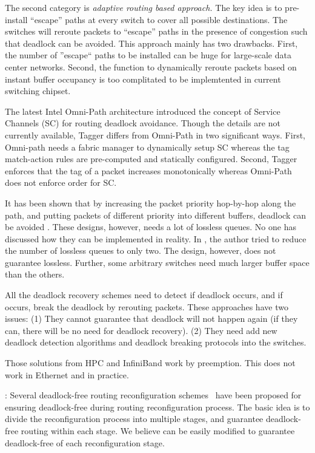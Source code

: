 The second category is {\em adaptive routing based approach.} The key idea is to pre-install  ``escape'' paths at every switch to cover all possible destinations. The switches will reroute packets to ``escape'' paths in the presence of congestion such that deadlock can be avoided. This approach mainly has two drawbacks. First, the number of ''escape`` paths to be installed can be huge for large-scale data center networks. Second, the function to dynamically reroute packets based on instant buffer occupancy is too complitated to be implemtented in current switching chipset.


The latest Intel Omni-Path architecture \cite{omnipath} introduced the concept of Service Channels (SC) for routing deadlock avoidance. Though the details are not currently available, Tagger differs from Omni-Path in two significant ways. First, Omni-path needs a fabric manager to dynamically setup SC whereas the tag match-action rules are pre-computed and statically configured. Second, Tagger enforces that the tag of a packet increases monotonically whereas Omni-Path does not enforce order for SC.

 It has been shown that by increasing the packet priority hop-by-hop along the path, and putting packets of different priority into different buffers, deadlock can be avoided \cite{firstpaper,survey,datanetworks,karol2003prevention}. These designs, however, needs a lot of lossless queues. No one
has discussed how they can be implemented in reality. In \cite{dag}, the author tried to reduce the number of lossless queues to only two. The design, however, does not guarantee lossless. Further, some arbitrary switches need much larger buffer space than the others.

All the deadlock recovery schemes \cite{isca95,shpiner2016unlocking,venkatramani1996,martinez1997,Lopez1998} need to detect if deadlock occurs, and if occurs, break the deadlock by rerouting packets. These approaches have two issues: (1) They cannot guarantee that deadlock will not happen again (if they can, there will be no need for deadlock recovery). (2) They need add new deadlock detection algorithms and deadlock breaking protocols into the switches.

 Those solutions from HPC and InfiniBand
work by preemption. This does not work in Ethernet and in practice.


: Several deadlock-free routing reconfiguration schemes~\cite{automatic,lysne2005,doublescheme,gara2005} have been proposed for ensuring deadlock-free during routing reconfiguration process. The basic idea is to divide the reconfiguration process into multiple stages, and guarantee deadlock-free routing within each stage.  We believe \sysname{} can be easily modified to guarantee deadlock-free of each reconfiguration stage. 

